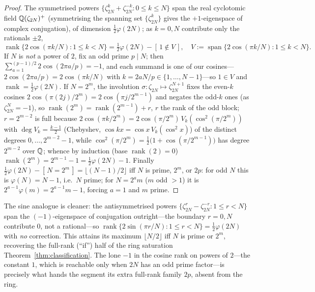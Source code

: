 \begin{proof}
The symmetrised powers $\{\zeta_{2N}^k+\zeta_{2N}^{-k}:0\le k\le N\}$ span the real cyclotomic field
$\mathbb{Q}(\zeta_{2N})^+$ (symmetrising the spanning set $\{\zeta_{2N}^k\}$ gives the $+1$-eigenspace of complex
conjugation), of dimension $\tfrac12\varphi(2N)$; as $k=0,N$ contribute only the rationals $\pm2$,
\[
  \operatorname{rank}\{2\cos(\pi k/N):1\le k<N\}=\tfrac12\varphi(2N)-[\,1\notin V\,],\quad
  V:=\operatorname{span}\{2\cos(\pi k/N):1\le k<N\}.
\]
If $N$ is \emph{not} a power of $2$, fix an odd prime $p\mid N$; then $\sum_{a=1}^{(p-1)/2}2\cos(2\pi a/p)=-1$,
and each summand is one of our cosines---$2\cos(2\pi a/p)=2\cos(\pi k/N)$ with $k=2aN/p\in\{1,\dots,N-1\}$---so
$1\in V$ and $\operatorname{rank}=\tfrac12\varphi(2N)$. If $N=2^m$, the involution
$\sigma:\zeta_{2N}\mapsto\zeta_{2N}^{N+1}$ fixes the even-$k$ cosines $2\cos(\pi(2j)/2^m)=2\cos(\pi j/2^{m-1})$
and negates the odd-$k$ ones (as $\zeta_{2N}^{N}=-1$), so $\operatorname{rank}(2^m)=\operatorname{rank}(2^{m-1})+r$,
$r$ the rank of the odd block; $r=2^{m-2}$ is full because $2\cos(\pi k/2^m)=2\cos(\pi/2^m)\,V_k(\cos^2(\pi/2^m))$
with $\deg V_k=\tfrac{k-1}2$ (Chebyshev, $\cos kx=\cos x\,V_k(\cos^2x)$) of the distinct degrees
$0,\dots,2^{m-2}-1$, while $\cos^2(\pi/2^m)=\tfrac12\bigl(1+\cos(\pi/2^{m-1})\bigr)$ has degree $2^{m-2}$ over $\mathbb{Q}$; whence by
induction (base $\operatorname{rank}(2)=0$) $\operatorname{rank}(2^m)=2^{m-1}-1=\tfrac12\varphi(2N)-1$. Finally
$\tfrac12\varphi(2N)-[\,N=2^m\,]=\lfloor(N-1)/2\rfloor$ iff $N$ is prime, $2^m$, or $2p$: for odd $N$ this is
$\varphi(N)=N-1$, i.e.\ $N$ prime; for $N=2^a m$ ($m$ odd $>1$) it is $2^{a-1}\varphi(m)=2^{a-1}m-1$, forcing
$a=1$ and $m$ prime.
\end{proof}

\begin{remark}\label{rem:sincos-rank}
The sine analogue is cleaner: the antisymmetrised powers $\{\zeta_{2N}^r-\zeta_{2N}^{-r}:1\le r<N\}$ span the
$(-1)$-eigenspace of conjugation outright---the boundary $r=0,N$ contribute $0$, not a rational---so
$\operatorname{rank}\{2\sin(\pi r/N):1\le r<N\}=\tfrac12\varphi(2N)$ with \emph{no} correction. This attains
its maximum $\lfloor N/2\rfloor$ iff $N$ is prime or $2^m$, recovering the full-rank (``if'') half of the ring
saturation Theorem~\ref{thm:classification}. The lone $-1$ in the cosine rank on powers of $2$---the constant $1$, which
is reachable only when $2N$ has an odd prime factor---is precisely what hands the segment its extra full-rank
family $2p$, absent from the ring.
\end{remark}

